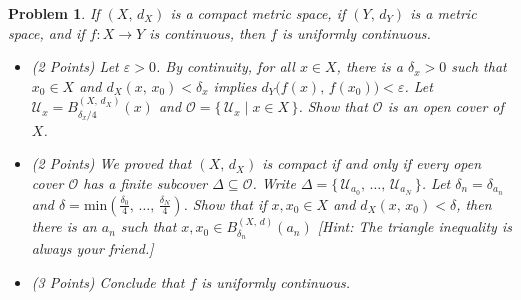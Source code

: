 \documentclass{article}
\theoremstyle{normal}
\newtheorem{problem}{Problem}
\begin{document}
\begin{problem}
        If $(X,\,d_{X})$ is a compact metric space, if $(Y,\,d_{Y})$ is a
        metric space, and if $f:X\rightarrow{Y}$ is continuous, then $f$ is
        uniformly continuous.
        \begin{itemize}
            \item (2 Points)
                Let $\varepsilon>0$. By continuity, for all $x\in{X}$, there
                is a $\delta_{x}>0$ such that $x_{0}\in{X}$ and
                $d_{X}(x,\,x_{0})<\delta_{x}$ implies
                $d_{Y}\big(f(x),\,f(x_{0})\big)<\varepsilon$.
                Let $\mathcal{U}_{x}=B_{\delta_{x}/4}^{(X,\,d_{X})}(x)$ and
                $\mathcal{O}=\{\,\mathcal{U}_{x}\;|\;x\in{X}\,\}$. Show that
                $\mathcal{O}$ is an open cover of $X$.
            \item (2 Points) We proved that $(X,\,d_{X})$ is compact
                if and only if every
                open cover $\mathcal{O}$ has a finite subcover
                $\Delta\subseteq\mathcal{O}$. Write
                $\Delta=\{\,\mathcal{U}_{a_{0}},\,\dots,\,\mathcal{U}_{a_{N}}\,\}$.
                Let $\delta_{n}=\delta_{a_{n}}$ and
                $\delta=\textrm{min}(\frac{\delta_{0}}{4},\,\dots,\,\frac{\delta_{N}}{4})$.
                Show that if $x,x_{0}\in{X}$ and
                $d_{X}(x,\,x_{0})<\delta$, then there is an
                $a_{n}$ such that $x,x_{0}\in{B}_{\delta_{n}}^{(X,\,d)}(a_{n})$
                [Hint: The triangle inequality is always your friend.]
            \item (3 Points) Conclude that $f$ is uniformly continuous.
        \end{itemize}
    \end{problem}
    \clearpage
\end{document}

